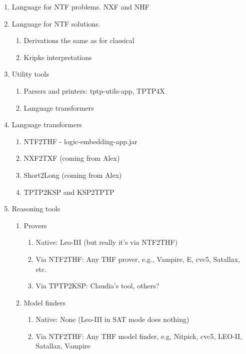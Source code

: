 \documentclass[runningheads]{llncs}
\begin{document}
\begin{enumerate}
\item Language for NTF problems. NXF and NHF

\item Language for NTF solutions.
      \begin{enumerate}
      \item Derivations the same as for classical
      \item Kripke interpretations
      \end{enumerate}

\item Utility tools
      \begin{enumerate}
      \item Parsers and printers: tptp-utils-app, TPTP4X
      \item Language transformers
      \end{enumerate}

\item Language transformers
      \begin{enumerate}
      \item NTF2THF - logic-embedding-app.jar
      \item NXF2TXF (coming from Alex)
      \item Short2Long (coming from Alex)
      \item TPTP2KSP and KSP2TPTP
      \end{enumerate}

\item Reasoning tools
      \begin{enumerate}
      \item Provers
            \begin{enumerate}
            \item  Native: Leo-III (but really it's via NTF2THF)
            \item Via NTF2THF: Any THF prover, e.g., Vampire, E, cvc5, Satallax, etc.
            \item Via TPTP2KSP: Claudia's tool, others?
            \end{enumerate}
      \item Model finders
            \begin{enumerate}
            \item Native: None (Leo-III in SAT mode does nothing)
            \item Via NTF2THF: Any THF model finder, e.g, Nitpick, cvc5, LEO-II, Satallax, Vampire
            \end{enumerate}
      \end{enumerate}


\end{enumerate}
\end{document}

